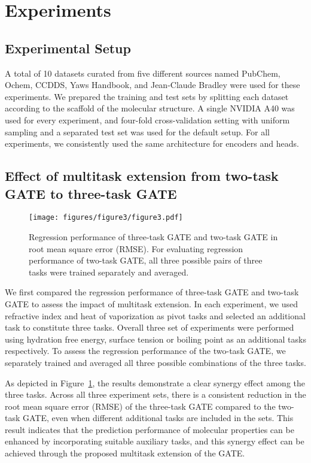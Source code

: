 \section{Experiments}
\subsection{Experimental Setup}

  A total of 10 datasets curated from five different sources named PubChem\cite{10.1093/nar/gkac956}, Ochem\cite{sushko2011online}, CCDDS, Yaws Handbook, and Jean-Claude Bradley were used for these experiments. We prepared the training and test sets by splitting each dataset according to the scaffold of the molecular structure\cite{bemis1996properties}. A single NVIDIA A40 was used for every experiment, and four-fold cross-validation setting with uniform sampling and a separated test set was used for the default setup. For all experiments, we consistently used the same architecture for encoders and heads.
  


\subsection{Effect of multitask extension from two-task GATE to three-task GATE}

\begin{figure}[t!]
\begin{center}
\texttt{[image: figures/figure3/figure3.pdf]}
\end{center}
\caption{Regression performance of three-task GATE and two-task GATE in root mean square error (RMSE). For evaluating regression performance of two-task GATE, all three possible pairs of three tasks were trained separately and averaged.}
\label{fig:fig3}
\end{figure}

  We first compared the regression performance of three-task GATE and two-task GATE to assess the impact of multitask extension. In each experiment, we used refractive index and heat of vaporization as pivot tasks and selected an additional task to constitute three tasks. Overall three set of experiments were performed using hydration free energy, surface tension or boiling point as an additional tasks respectively. To assess the regression performance of the two-task GATE, we separately trained and averaged all three possible combinations of the three tasks.
  
  As depicted in Figure~\ref{fig:fig3}, the results demonstrate a clear synergy effect among the three tasks. Across all three experiment sets, there is a consistent reduction in the root mean square error (RMSE) of the three-task GATE compared to the two-task GATE, even when different additional tasks are included in the sets. This result indicates that the prediction performance of molecular properties can be enhanced by incorporating suitable auxiliary tasks, and this synergy effect can be achieved through the proposed multitask extension of the GATE.

